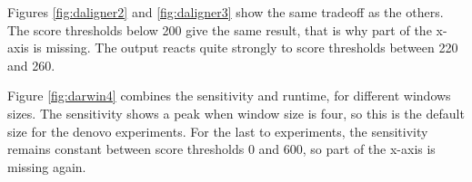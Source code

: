 \documentclass[../main/thesis.tex]{subfiles}
\begin{document}
Figures \ref{fig:daligner2} and \ref{fig:daligner3} show the same tradeoff as the others.
The score thresholds below 200 give the same result, that is why part of the x-axis is missing.
The output reacts quite strongly to score thresholds between 220 and 260.

Figure \ref{fig:darwin4} combines the sensitivity and runtime, for different windows sizes.
The sensitivity shows a peak when window size is four, so this is the default size for the denovo experiments.
For the last to experiments, the sensitivity remains constant between score thresholds 0 and 600, so part of the x-axis is missing again.
\end{document}

